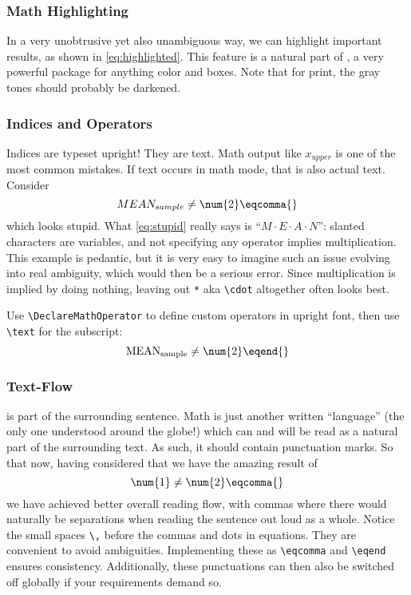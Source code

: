 \subsubsection{Math Highlighting}

In a very unobtrusive yet also unambiguous way, we can highlight important results,
as shown in \cref{eq:highlighted}.
This feature is a natural part of ,
a very powerful package for anything color and boxes.
Note that for print, the gray tones should probably be darkened.

\subsubsection{Indices and Operators}

Indices are typeset upright!
They are text.
Math output like \(x_{upper}\) is one of the most common mistakes.
If text occurs in math mode, that is also actual text.
Consider
\begin{equation}\label{eq:stupid}
    MEAN_{sample} \neq \num{2}\eqcomma{}
\end{equation}
which looks stupid.
What \cref{eq:stupid} really says is \enquote{\(M \cdot E \cdot A \cdot N\)}:
slanted characters are variables, and not specifying any operator implies
multiplication.
This example is pedantic, but it is very easy to imagine such an issue evolving
into real ambiguity, which would then be a serious error.
Since multiplication is implied by doing nothing, leaving out \verb|*| aka
\verb|\cdot| altogether often looks best.

Use \verb|\DeclareMathOperator| to define custom operators in upright font,
then use \verb|\text| for the subscript:
\begin{equation}\label{eq:eqend}
    \operatorname{MEAN}_{\text{sample}} \neq \num{2} \eqend{}
\end{equation}

\subsubsection{Text-Flow}

 is part of the surrounding sentence.
Math is just another written \enquote{language} (the only one understood around
the globe!) which can and will be read as a natural part of the surrounding text.
As such, it should contain punctuation marks.
So that now, having considered that we have the amazing result of
\begin{equation}
    \num{1} \neq \num{2} \eqcomma{}
\end{equation}
we have achieved better overall reading flow, with commas where there would
naturally be separations when reading the sentence out loud as a whole.
Notice the small spaces \verb|\,| before the commas and dots in equations.
They are convenient to avoid ambiguities.
Implementing these as \verb|\eqcomma| and \verb|\eqend| ensures consistency.
Additionally, these punctuations can then also be switched off globally if your
requirements demand so.

